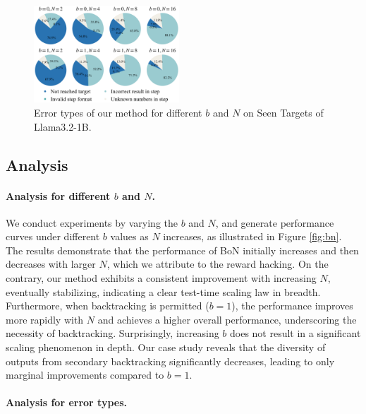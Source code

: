 \documentclass{article}
\theoremstyle{plain}
\theoremstyle{definition}
\theoremstyle{remark}
\begin{document}
\begin{figure}[t]
  \centering
\includegraphics[width=0.485\textwidth]{fig/pie_charts_small.png}
\vspace{-10pt}
  \caption{Error types of our method for different $b$ and $N$ on Seen Targets of Llama3.2-1B.}
  \vspace{-10pt}
  \label{fig:pie}
\end{figure}
\subsection{Analysis}
\paragraph{Analysis for different $b$ and $N$.}
We conduct experiments by varying the $b$ and $N$, and generate performance curves under different $b$ values as $N$ increases, as illustrated in Figure \ref{fig:bn}. The results demonstrate that the performance of BoN initially increases and then decreases with larger $N$, which we attribute to the reward hacking. On the contrary, our method exhibits a consistent improvement with increasing $N$, eventually stabilizing, indicating a clear test-time scaling law in breadth. Furthermore, when backtracking is permitted ($b=1$), the performance improves more rapidly with $N$ and achieves a higher overall performance, underscoring the necessity of backtracking. Surprisingly, increasing $b$ does not result in a significant scaling phenomenon in depth. Our case study reveals that the diversity of outputs from secondary backtracking significantly decreases, leading to only marginal improvements compared to $b=1$.


\paragraph{Analysis for error types.}
\end{document}
